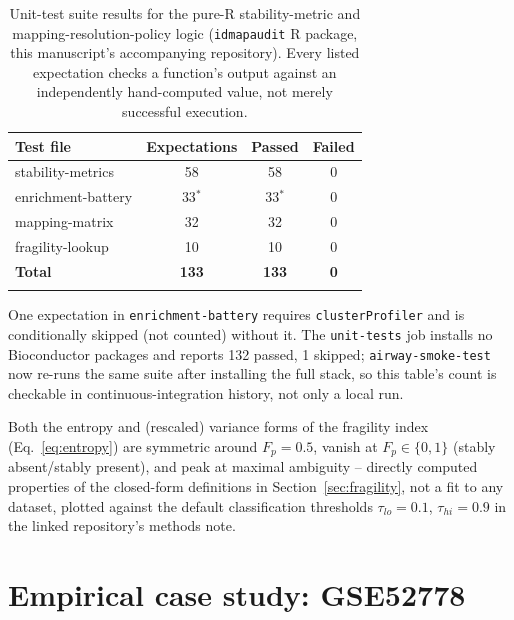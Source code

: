 \documentclass[webpdf,contemporary,large]{oup-authoring-template}
\theoremstyle{thmstyleone}%
\theoremstyle{thmstyletwo}%
\theoremstyle{thmstylethree}%
\begin{document}
\begin{table}[!t]
\caption{Unit-test suite results for the pure-R stability-metric and mapping-resolution-policy logic (\texttt{idmapaudit} R package, this manuscript's accompanying repository). Every listed expectation checks a function's output against an independently hand-computed value, not merely successful execution.\label{tab:tests}}
\begin{tabular*}{\columnwidth}{@{\extracolsep\fill}lccc@{\extracolsep\fill}}
\toprule
Test file & Expectations & Passed & Failed \\
\midrule
stability-metrics   & 58  & 58  & 0 \\
enrichment-battery  & 33$^{*}$ & 33$^{*}$ & 0 \\
mapping-matrix      & 32  & 32  & 0 \\
fragility-lookup    & 10  & 10  & 0 \\
\midrule
\textbf{Total}      & \textbf{133} & \textbf{133} & \textbf{0} \\
\botrule
\end{tabular*}
\begin{tablenotes}
\item[$^{*}$] One expectation in \texttt{enrichment-battery} requires \texttt{clusterProfiler} and is conditionally skipped (not counted) without it. The \texttt{unit-tests} job installs no Bioconductor packages and reports 132 passed, 1 skipped; \texttt{airway-smoke-test} now re-runs the same suite after installing the full stack, so this table's count is checkable in continuous-integration history, not only a local run.
\end{tablenotes}
\end{table}

Both the entropy and (rescaled) variance forms of the fragility index (Eq.~\ref{eq:entropy}) are symmetric around $F_p=0.5$, vanish at $F_p\in\{0,1\}$ (stably absent/stably present), and peak at maximal ambiguity -- directly computed properties of the closed-form definitions in Section~\ref{sec:fragility}, not a fit to any dataset, plotted against the default classification thresholds $\tau_{lo}=0.1$, $\tau_{hi}=0.9$ in the linked repository's methods note.

\section{Empirical case study: GSE52778}\label{sec:real}
\end{document}

